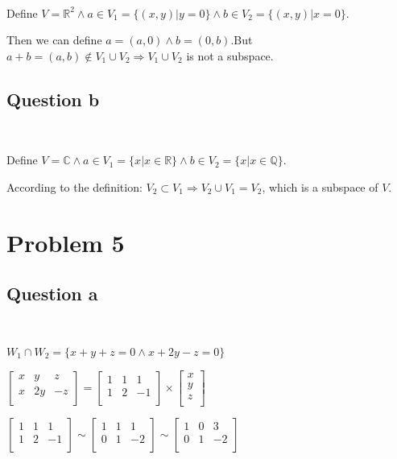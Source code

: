 \documentclass{article}
\def\R{\mathbb{R}}
\begin{document}
~

Define $V=\R^2 \land a\in V_1=\{(x,y)|y=0\} \land b\in V_2=\{(x,y)|x=0\}$. 

Then we can define $a=(a,0) \land b=(0,b)$.But $a+b=(a,b)\notin V_1 \cup V_2 \Rightarrow V_1 \cup V_2$ is not a subspace.

\subsection{Question b}

~

Define $V=\mathbb{C} \land a\in V_1=\{x|x\in\R\} \land b\in V_2=\{x|x\in \mathbb{Q}\}$.

According to the definition: $V_2\subset V_1 \Rightarrow V_2\cup V_1=V_2$, which is a subspace of $V$.

\section{Problem 5}

\subsection{Question a}

~

$W_1\cap W_2= \{x+y+z=0\land x+2y-z=0\}$

$\begin{bmatrix}
x&y&z\\
x&2y&-z\\
\end{bmatrix}
=
\begin{bmatrix}
1 & 1 & 1 \\
1 & 2 & -1 \\
\end{bmatrix}
\times
\begin{bmatrix}
x\\
y\\
z\\
\end{bmatrix}
$

$\begin{bmatrix}
1& 1 & 1 \\
1 & 2 & -1 \\
\end{bmatrix}
\sim
\begin{bmatrix}
1&1&1\\
0&1&-2\\
\end{bmatrix}
\sim
\begin{bmatrix}
1&0&3\\
0&1&-2\\
\end{bmatrix}
$
\end{document}
